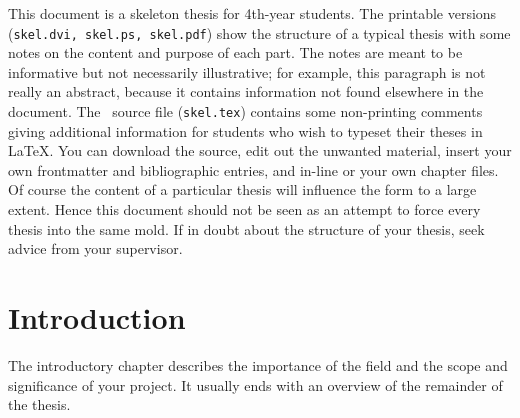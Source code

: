 \documentclass[12pt,openany,a4paper]{book}
\begin{document}
This document is a skeleton thesis for 4th-year students.  The
printable versions (\texttt{skel.dvi, skel.ps, skel.pdf})
show the structure of a typical thesis with some notes on the content
and purpose of each part.  The notes are meant to be informative but
not necessarily illustrative; for example, this paragraph is not
really an abstract, because it contains information not found
elsewhere in the document.  The \LaTeXe\ source file
(\texttt{skel.tex}) contains some non-printing comments giving
additional information for students who wish to typeset their theses
in \LaTeX.  You can download the source, edit out the unwanted
material, insert your own frontmatter and bibliographic entries, and
in-line or \verb++ your own chapter files.  Of course the
content of a particular thesis will influence the form to a large
extent.  Hence this document should not be seen as an attempt to force
every thesis into the same mold.  If in doubt about the structure of
your thesis, seek advice from your supervisor.

\tableofcontents

\listoffigures
{}

\listoftables
{}

% 

\cleardoublepage

\mainmatter


%
%
%
%	
%	

\chapter{Introduction}

The introductory chapter describes the importance of the field and the
scope and significance of your project.  It usually ends with an
overview of the remainder of the thesis.
\end{document}
